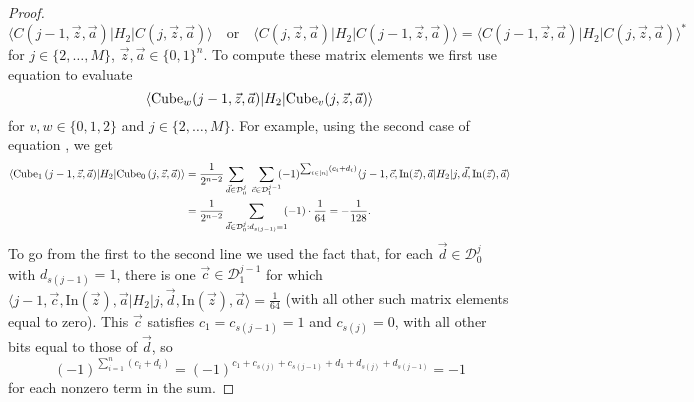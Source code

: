 \documentclass[../thesis-main/thesis-main]{subfiles}
\begin{document}
\begin{proof}
\[
\langle C(j-1,\vec{z},\vec{a})|H_{2}|C(j,\vec{z},\vec{a})\rangle\quad
\text{or}\quad\langle C(j,\vec{z},\vec{a})|H_{2}|C(j-1,\vec{z},\vec{a})\rangle
=\langle C(j-1,\vec{z},\vec{a})|H_{2}|C(j,\vec{z},\vec{a})\rangle^{*}
\]
for $j\in\{2,\ldots,M\}$, $\vec{z},\vec{a}\in\{0,1\}^{n}$. To compute these matrix elements we first use equation  to evaluate 
\[
\langle{\operatorname{Cube}_{w}(j-1,\vec{z},\vec{a})}|H_{2}|{\operatorname{Cube}_{v}(j,\vec{z},\vec{a})}\rangle
\]
for $v,w\in\{0,1,2\}$ and $j\in\{2,\ldots,M\}$. For example, using the second case of equation , we get
\begin{align*}
\langle{\operatorname{Cube}_{1}\left(j-1,\vec{z},\vec{a}\right)}|H_{2}|{\operatorname{Cube}_{0}\left(j,\vec{z},\vec{a}\right)}\rangle & = 
 \frac{1}{2^{n-2}}\sum_{\vec{d}\in\mathcal{D}_{0}^{j}}\; \sum_{\vec{c}\in\mathcal{D}_{1}^{j-1}} \!\!(-1)^{\sum_{i\in[n]} (c_i +d_i)}\langle j-1,\vec{c},\text{In}(\vec{z}),\vec{a}|H_2|j,\vec{d},\text{In}(\vec{z}),\vec{a}\rangle \\
& = \frac{1}{2^{n-2}}\sum_{\vec{d}\in\mathcal{D}_{0}^{j}:d_{s(j-1)}=1}\!\!(-1)\cdot\frac{1}{64}=-\frac{1}{128}.
\end{align*}
To go from the first to the second line we used the fact that, for each $\vec{d}\in\mathcal{D}_{0}^{j}$ with $d_{s(j-1)}=1$, there is one $\vec{c}\in\mathcal{D}_{1}^{j-1}$ for which $\langle j-1,\vec{c},\text{In}(\vec{z}),\vec{a}|H_2|j,\vec{d},\text{In}(\vec{z}),\vec{a}\rangle=\frac{1}{64}$ (with all other such matrix elements equal to zero). This $\vec{c}$ satisfies $c_1=c_{s(j-1)}=1$ and $c_{s(j)}=0$, with all other bits equal to those of $\vec{d}$, so 
\[
(-1)^{\sum_{i=1}^{n}\left(c_{i}+d_{i}\right)}=(-1)^{c_{1}+c_{s(j)}+c_{s(j-1)}+d_{1}+d_{s(j)}+d_{s(j-1)}}=-1
\]
for each nonzero term in the sum.


\end{proof}
\end{document}
